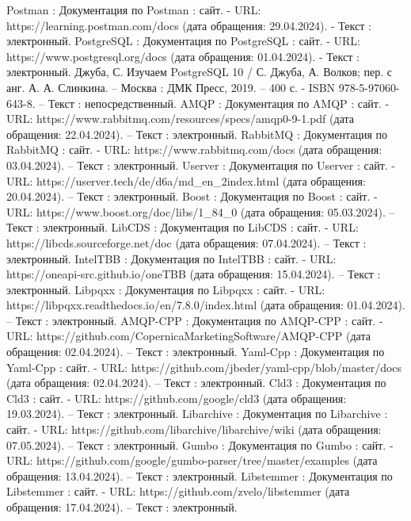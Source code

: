 \begin{thebibliography}{51}
	 Postman : Документация по Postman : сайт. - URL: https://learning.postman.com/docs (дата обращения: 29.04.2024). - Текст : электронный.
	 PostgreSQL : Документация по PostgreSQL : сайт. - URL: https://www.postgresql.org/docs (дата обращения: 01.04.2024). - Текст : электронный.
	 Джуба, С. Изучаем PostgreSQL 10 / С. Джуба, А. Волков; пер. с анг. А. А. Слинкина. – Москва : ДМК Пресс, 2019. – 400 с. - ISBN 978-5-97060-643-8. – Текст : непосредственный.
	 AMQP : Документация по AMQP : сайт. - URL: https://www.rabbitmq.com/resources/specs/amqp0-9-1.pdf (дата обращения: 22.04.2024). – Текст : электронный.
	 RabbitMQ : Документация по RabbitMQ : сайт. - URL: https://www.rabbitmq.com/docs (дата обращения: 03.04.2024). – Текст : электронный.
	 Userver : Документация по Userver : сайт. - URL: https://userver.tech/de/d6a/md\_en\_2index.html (дата обращения: 20.04.2024). – Текст : электронный.
	 Boost : Документация по Boost : сайт. - URL: https://www.boost.org/doc/libs/1\_84\_0 (дата обращения: 05.03.2024). – Текст : электронный.
	 LibCDS : Документация по LibCDS : сайт. - URL: https://libcds.sourceforge.net/doc (дата обращения: 07.04.2024). – Текст : электронный.
	 IntelTBB : Документация по IntelTBB : сайт. - URL: https://oneapi-src.github.io/oneTBB (дата обращения: 15.04.2024). – Текст : электронный.	
	 Libpqxx : Документация по Libpqxx : сайт. - URL: https://libpqxx.readthedocs.io/en/7.8.0/index.html (дата обращения: 01.04.2024). – Текст : электронный.
	 AMQP-CPP : Документация по AMQP-CPP : сайт. - URL: https://github.com/CopernicaMarketingSoftware/AMQP-CPP (дата обращения: 02.04.2024). – Текст : электронный.
	 Yaml-Cpp : Документация по Yaml-Cpp : сайт. - URL: https://github.com/jbeder/yaml-cpp/blob/master/docs (дата обращения: 02.04.2024). – Текст : электронный.
	 Cld3 : Документация по Cld3 : сайт. - URL: https://github.com/google/cld3 (дата обращения: 19.03.2024). – Текст : электронный.
	 Libarchive : Документация по Libarchive : сайт. - URL: https://github.com/libarchive/libarchive/wiki (дата обращения: 07.05.2024). – Текст : электронный.
	 Gumbo : Документация по Gumbo : сайт. - URL: https://github.com/google/gumbo-parser/tree/master/examples (дата обращения: 13.04.2024). – Текст : электронный.
	 Libstemmer : Документация по Libstemmer : сайт. - URL: https://github.com/zvelo/libstemmer (дата обращения: 17.04.2024). – Текст : электронный.

\end{thebibliography}
